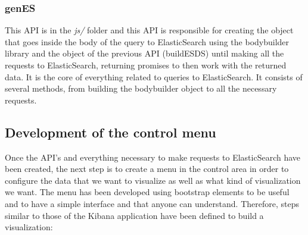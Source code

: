 \documentclass[a4paper, 12pt]{book}
\begin{document}
\subsubsection{genES}
This API is in the \textit{js/} folder and this API is responsible for creating the object that goes inside the body of the query to ElasticSearch using the bodybuilder library and the object of the previous API (buildESDS) until making all the requests to ElasticSearch, returning promises to then work with the returned data. It is the core of everything related to queries to ElasticSearch. It consists of several methods, from building the bodybuilder object to all the necessary requests.


\subsection{Development of the control menu}

Once the API's and everything necessary to make requests to ElasticSearch have been created, the next step is to create a menu in the control area in order to configure the data that we want to visualize as well as what kind of visualization we want. The menu has been developed using bootstrap elements to be useful and to have a simple interface and that anyone can understand. Therefore, steps similar to those of the Kibana application have been defined to build a visualization:
\end{document}
